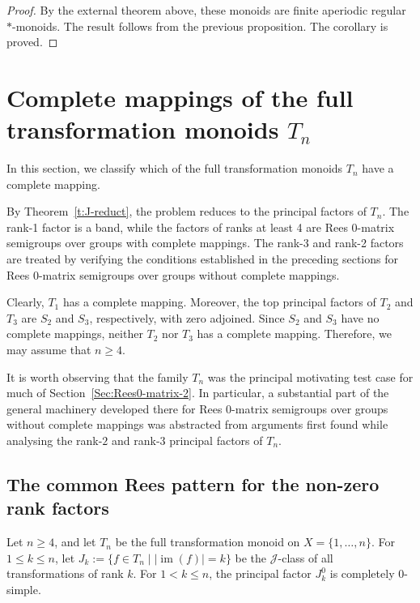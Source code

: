 \documentclass[11pt]{article}
\theoremstyle{plain}
\theoremstyle{remark}
\theoremstyle{definition}
\theoremstyle{plain}
\DeclareMathOperator{\im}{im}
\begin{document}
\begin{proof}
By the external theorem above, these monoids are finite aperiodic regular
$*$-monoids. The result follows from the previous proposition. The corollary
is proved.
\end{proof}

\endgroup
\section[Complete mappings of full transformation monoids]{Complete mappings of the full transformation monoids $T_n$}
\label{Sec:Tn}

In this section, we classify which of the full transformation monoids $T_n$
have a complete mapping. 

By Theorem~\ref{t:J-reduct}, the problem  reduces to the principal factors of
$T_n$. The rank-1 factor is a band, while the factors of ranks at least 4 are
Rees $0$-matrix semigroups over groups with complete mappings. The rank-3 and
rank-2 factors are treated by verifying the conditions established in the
preceding sections for Rees $0$-matrix semigroups over groups without complete
mappings.

Clearly, $T_1$ has a complete mapping. Moreover, the top principal factors of
$T_2$ and $T_3$ are $S_2$ and $S_3$, respectively, with zero adjoined. Since
$S_2$ and $S_3$ have no complete mappings, neither $T_2$ nor $T_3$ has a
complete mapping. Therefore, we may assume that $n\ge4$.

{It is worth observing that the family $T_n$ was the principal
motivating test case for much of Section~\ref{Sec:Rees0-matrix-2}. In
particular, a substantial part of the general machinery developed there for
Rees $0$-matrix semigroups over groups without complete mappings was abstracted
from arguments first found while analysing the rank-$2$ and rank-$3$ principal
factors of $T_n$.}

\subsection{The common Rees pattern for the non-zero rank factors}
\label{Sec:Tn-Rees-pattern}
\label{Sec:Tn-rank-greater-three}

Let $n\ge4$, and let $T_n$ be the full transformation monoid on
$X=\{1,\ldots,n\}$. For $1\le k\le n$, let
\({J_k}:=\{f\in T_n\mid |\im(f)|=k\}\)
be the $\mathcal J$-class of all transformations of rank $k$. For
$1<k\le n$, the principal factor $J_k^0$ is completely $0$-simple.
\end{document}
